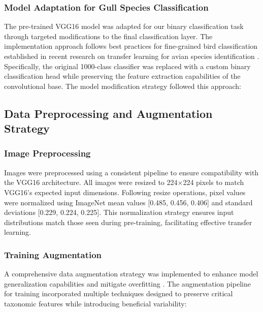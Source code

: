 \documentclass[a4paper,12pt]{article}
\begin{document}
\subsubsection{Model Adaptation for Gull Species Classification}

The pre-trained VGG16 model was adapted for our binary classification task through targeted modifications to the final classification layer. The implementation approach follows best practices for fine-grained bird classification established in recent research on transfer learning for avian species identification \citep{ghani2024comprehensive, reslan2022automatic}. Specifically, the original 1000-class classifier was replaced with a custom binary classification head while preserving the feature extraction capabilities of the convolutional base. The model modification strategy followed this approach:



\subsection{Data Preprocessing and Augmentation Strategy}

\subsubsection{Image Preprocessing}

Images were preprocessed using a consistent pipeline to ensure compatibility with the VGG16 architecture. All images were resized to 224$\times$224 pixels to match VGG16's expected input dimensions. Following resize operations, pixel values were normalized using ImageNet mean values [0.485, 0.456, 0.406] and standard deviations [0.229, 0.224, 0.225]. This normalization strategy ensures input distributions match those seen during pre-training, facilitating effective transfer learning.

\subsubsection{Training Augmentation}

A comprehensive data augmentation strategy was implemented to enhance model generalization capabilities and mitigate overfitting \citep{shorten2019survey}. The augmentation pipeline for training incorporated multiple techniques designed to preserve critical taxonomic features while introducing beneficial variability:
\end{document}
